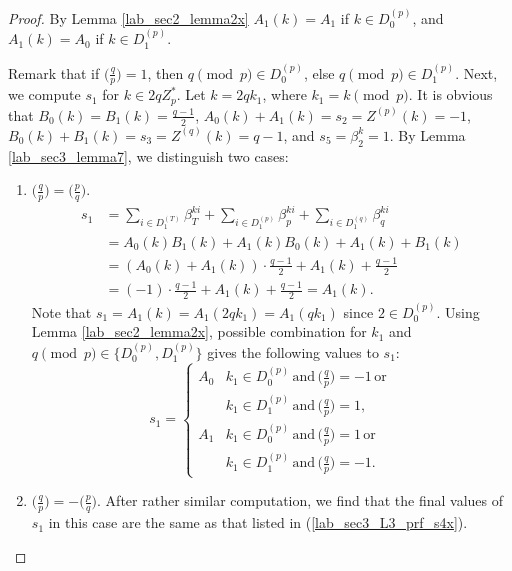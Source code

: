\documentclass{mcom-l}
\theoremstyle{definition}
\numberwithin{equation}{section}
\begin{document}
\begin{proof}
     By Lemma \ref{lab_sec2_lemma2x} $ A_{1}(k) =A_{1}$ if $ k\in D_{0}^{(p)} $, and $ A_{1}(k) =A_{0}$ if $ k\in D_{1}^{(p)} $.
     
     Remark that if  $ \bigl(\tfrac{q}{p}\bigr)=1 $, then $ q \pmod p \in D_{0}^{(p)}$, else $ q \pmod p \in D_{1}^{(p)}$. Next, we compute $ s_{1} $ for  $ k\in 2qZ_{p}^{*} $. Let $ k=2qk_{1} $,  where $ k_{1}=k \pmod{p} $. It is obvious that $ B_{0}(k) = B_{1}(k)=\tfrac{q-1}{2}$, $ A_{0}(k)+A_{1}(k)=s_{2}=Z^{(p)}(k)=-1 $, $ B_{0}(k)+B_{1}(k)=s_{3}=Z^{(q)}(k)=q-1 $, and $ s_{5}=\beta_{2}^{k}=1 $. By Lemma \ref{lab_sec3_lemma7}, we distinguish two cases:
     \begin{enumerate}
     \item $ \bigl(\tfrac{q}{p}\bigr)=\bigl(\tfrac{p}{q}\bigr) $.
     \begin{equation*}
     \begin{split}
     s_{1}&=\sum_{i\in D_{1}^{(T)}}\beta_{T}^{ki}+\sum_{i\in D_{1}^{(p)}}\beta_{p}^{ki}+\sum_{i\in D_{1}^{(q)}}\beta_{q}^{ki} \\
     &=A_{0}(k)B_{1}(k)+A_{1}(k)B_{0}(k)+A_{1}(k)+B_{1}(k)\\
     &=(A_{0}(k)+A_{1}(k))\cdot\frac{q-1}{2}+A_{1}(k)+\frac{q-1}{2}\\
     &=(-1)\cdot\frac{q-1}{2}+A_{1}(k)+\frac{q-1}{2}=A_{1}(k).
     \end{split}
     \end{equation*}
     Note that $ s_{1}=A_{1}(k)=A_{1}(2qk_{1})=A_{1}(qk_{1}) $ since $ 2\in  D_{0}^{(p)} $. Using Lemma \ref{lab_sec2_lemma2x}, possible combination for $ k_{1} $ and $ q\pmod p\in \lbrace D_{0}^{(p)},D_{1}^{(p)}\rbrace $ gives the following values to $ s_{1} $:
     \begin{equation}\label{lab_sec3_L3_prf_s4x}
        s_{1}=
        \begin{cases}
        A_{0}&k_{1}\in D_{0}^{(p)}\,\text{and}\,\bigl(\frac{q}{p}\bigr)=-1\,\text{or}\,\\
        &k_{1}\in D_{1}^{(p)}\,\text{and}\,\bigl(\frac{q}{p}\bigr)=1,\\
        A_{1}&k_{1}\in D_{0}^{(p)}\,\text{and}\,\bigl(\frac{q}{p}\bigr)=1\,\text{or}\,\\
        &k_{1}\in D_{1}^{(p)}\,\text{and}\,\bigl(\frac{q}{p}\bigr)=-1.
        \end{cases}
        \end{equation}
     \item $ \bigl(\tfrac{q}{p}\bigr)=-\bigl(\tfrac{p}{q}\bigr) $.
      After rather similar computation, we find that the final values of $ s_{1} $ in this case are the same as that listed in (\ref{lab_sec3_L3_prf_s4x}).
     \end{enumerate}
     

\end{proof}
\end{document}
